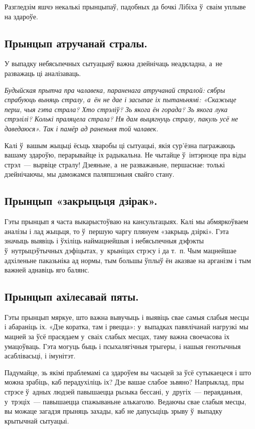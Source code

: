 Разгледзім яшчэ некалькі прынцыпаў, падобных да бочкі Лібіха ў~сваім уплыве на здароўе.

\subsection*{Прынцып атручанай стралы.}

У выпадку небясьпечных сытуацыяў важна дзейнічаць неадкладна, а~не разважаць ці аналізаваць. 

\emph{Будыйская прытча пра чалавека, параненага атручанай стралой: сябры спрабуюць выняць стралу, а~ён не дае і засыпае іх пытаньнямі: «Скажыце перш, чыя гэта страла? Хто стрэліў? Зь якога ён горада? Зь якога лука стрэлілі? Колькі праляцела страла? Ня дам выцягнуць стралу, пакуль усё не даведаюся». Так і памёр ад раненьня той чалавек.}

Калі ў~вашым жыцьці ёсьць хваробы ці сытуацыі, якія сур'ёзна пагражаюць вашаму здароўю, перарывайце іх радыкальна. Не чытайце ў~інтэрнэце пра віды стрэл~--- вырвіце стралу! Дзеяньне, а~не разважаньне, першаснае: толькі дзейнічаючы, мы даможамся паляпшэньня свайго стану.

\subsection*{Прынцып «закрыцьця дзірак».}

Гэты прынцып я часта выкарыстоўваю на кансультацыях. Калі мы абмяркоўваем аналізы і лад жыцьця, то ў~першую чаргу плянуем «закрыць дзіркі». Гэта значыць выявіць і ўхіліць наймацнейшыя і небясьпечныя дэфэкты ў~нутрыцэўтычных дэфіцытах, у~крыніцах стрэсу і да т.~п. Чым мацнейшае адхіленьне паказьніка ад нормы, тым большы ўплыў ён аказвае на арганізм і тым важней аднавіць яго балянс.

\subsection*{Прынцып ахілесавай пяты.}

Гэты прынцып мяркуе, што важна вывучыць і выявіць свае самыя слабыя месцы і абараніць іх. «Дзе коратка, там і рвецца»: у~выпадках павялічанай нагрузкі мы мацней за ўсё прасядаем у~сваіх слабых месцах, таму важна своечасова іх умацоўваць. Гэта могуць быць і псыхалягічныя трыгеры, і нашыя генэтычныя асаблівасьці, і імунітэт.

Падумайце, зь якімі праблемамі са здароўем вы часьцей за ўсё сутыкаецеся і што можна зрабіць, каб перадухіліць іх? Дзе вашае слабое зьвяно? Напрыклад, пры стрэсе ў~адных людзей павышаецца рызыка бессані, у~другіх~--- пераяданьня, у~трэціх~--- павышаецца спажываньне алькаголю. Ведаючы свае слабыя месцы, вы можаце загадзя прыняць захады, каб не дапусьціць зрыву ў~выпадку крытычнай сытуацыі.

